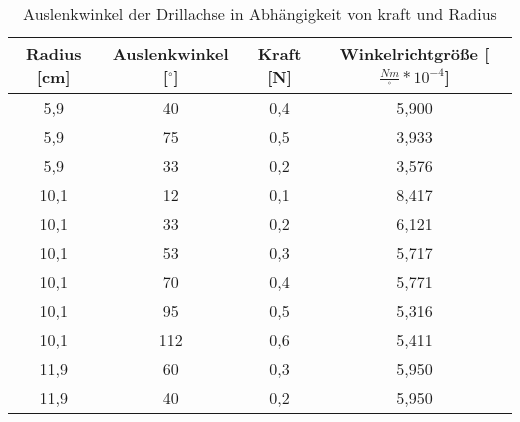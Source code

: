 \begin{table}[h]
	\begin{center}
		\begin{tabular}{cccc}
			Radius [cm]&Auslenkwinkel [$^\circ$]&Kraft [N]&Winkelrichtgröße [$\frac{Nm}{^\circ} *10^{-4}$] \\ \hline
			5,9	&40	&0,4	&5,900\\
			5,9	&75	&0,5	&3,933\\
			5,9	&33	&0,2	&3,576\\
			10,1&12	&0,1	&8,417\\
			10,1&33	&0,2	&6,121\\
			10,1&53	&0,3	&5,717\\
			10,1&70	&0,4	&5,771\\
			10,1&95	&0,5	&5,316\\
			10,1&112&0,6	&5,411\\
			11,9&60	&0,3	&5,950\\
			11,9&40	&0,2	&5,950
		\end{tabular}
		\caption{Auslenkwinkel der Drillachse in Abhängigkeit von kraft und Radius}
		\label{tab:drillachse}
	\end{center}
\end{table}